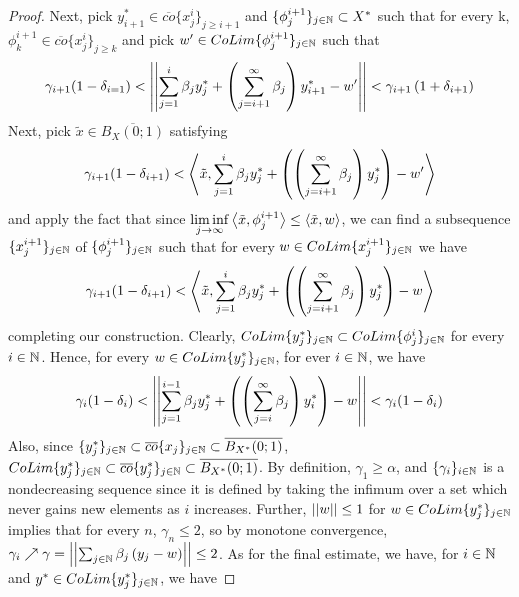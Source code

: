\begin{lem}
\begin{proof}
        Next, pick $y_{i+1}^* \in \overline{co}\{x_j^i\}_{j \geq i+1}$ and $\{\phi_j^{i+1}\}_{j \in \mathbb{N}} \subset X^*$ such that for every k, $\phi_k^{i+1} \in \overline{co}\{x_j^i\}_{j \geq k}$ and pick $w' \in CoLim\{\phi_j^{i+1}\}_{j \in \mathbb{N}}$ such that
        \begin{equation}
            \gamma_{i+1}(1-\delta_{i=1}) < \left|\left|  \sum_{j=1}^i \beta_j y_j^*+ \left(  \sum_{j=i+1}^{\infty} \beta_j\right) y_{i+1}^*-w' \right|\right| < \gamma_{i+1}\left( 1+\delta_{i+1}\right)
        \end{equation}
        Next, pick $\tilde{x} \in \overline{B_X(0;1)}$ satisfying
        \begin{equation}
            \gamma_{i+1}(1-\delta_{i+1}) < \left\langle \tilde{x}, \sum_{j=1}^i \beta_j y_j^*+ \left(  \left(  \sum_{j=i+1}^\infty \beta_j\right) y_j^*\right)-w' \right\rangle
        \end{equation}
        and apply the fact that since $\liminf\limits_{j \to \infty} \left\langle \tilde{x},\phi_j^{i+1} \right\rangle \leq \left\langle \tilde{x},w \right\rangle$, we can find a subsequence $\{x_j^{i+1}\}_{j \in \mathbb{N}}$ of $\{\phi_j^{i+1}\}_{j \in \mathbb{N}}$ such that for every $w \in CoLim\{x_j^{i+1}\}_{j \in \mathbb{N}}$ we have 
        \begin{equation}
            \gamma_{i+1}(1-\delta_{i+1}) < \left\langle \tilde{x}, \sum_{j=1}^i \beta_j y_j^*+ \left(  \left(  \sum_{j=i+1}^\infty \beta_j\right) y_j^*\right)-w \right\rangle
        \end{equation}
        completing our construction. 
        Clearly, $CoLim\{y_j^*\}_{j \in \mathbb{N}} \subset CoLim\{\phi_j^i\}_{j \in \mathbb{N}}$ for every $i \in \mathbb{N}$. Hence, for every $w \in CoLim\{y_j^*\}_{ j\in \mathbb{N}}$, for ever $i \in \mathbb{N}$, we have 
        \begin{equation}
            \gamma_i(1-\delta_i) < \left|\left| \sum_{j=1}^{i-1} \beta_j y_j^*+ \left( \left( \sum_{j=i}^\infty \beta_j\right) y_i^*\right)-w \right|\right| < \gamma_i(1-\delta_i)
        \end{equation}
        Also, since $\{y_j^*\}_{j \in \mathbb{N}} \subset \overline{co}\{x_j\}_{j \in \mathbb{N}} \subset \overline{B_{X^*}(0;1)}$, $CoLim\{y_j^*\}_{j \in \mathbb{N}} \subset \overline{co}\{y_j^*\}_{j \in \mathbb{N}} \subset \overline{B_{X^*}(0;1)}$.
        By definition, $\gamma_1 \geq \alpha$, and
        $\{\gamma_i\}_{i \in \mathbb{N}}$ is a nondecreasing sequence since it is defined by taking the infimum over a set which never gains new elements as $i$ increases. Further, $\left|\left| w \right|\right| \leq 1$ for $w \in CoLim\{y_j^*\}_{j \in \mathbb{N}}$ implies that for every $n$, $\gamma_n \leq 2$, so by monotone convergence, $\gamma_i \nearrow \gamma= \left|\left| \sum_{j \in \mathbb{N}}\beta_j \left( y_j-w\right) \right|\right|\leq 2$. 
        As for the final estimate, we have, for $i \in \mathbb{N}$ and $y^* \in CoLim\{y_j^*\}_{j \in \mathbb{N}}$, we have 
        

\end{proof}
\end{lem}
